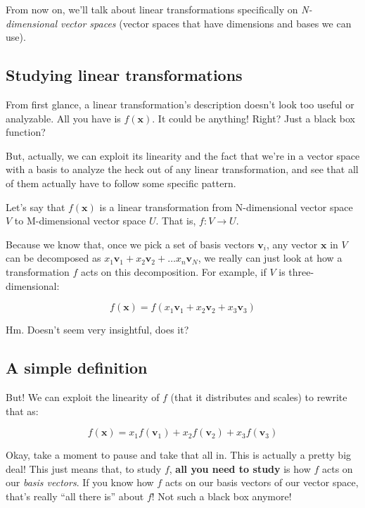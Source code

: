 \documentclass[]{article}
\begin{document}
From now on, we'll talk about linear transformations specifically on
\emph{N-dimensional vector spaces} (vector spaces that have dimensions and bases
we can use).

\hypertarget{studying-linear-transformations}{%
\subsection{Studying linear
transformations}\label{studying-linear-transformations}}

From first glance, a linear transformation's description doesn't look too useful
or analyzable. All you have is \(f(\mathbf{x})\). It could be anything! Right?
Just a black box function?

But, actually, we can exploit its linearity and the fact that we're in a vector
space with a basis to analyze the heck out of any linear transformation, and see
that all of them actually have to follow some specific pattern.

Let's say that \(f(\mathbf{x})\) is a linear transformation from N-dimensional
vector space \(V\) to M-dimensional vector space \(U\). That is,
\(f : V \rightarrow U\).

Because we know that, once we pick a set of basis vectors \(\mathbf{v}_i\), any
vector \(\mathbf{x}\) in \(V\) can be decomposed as
\(x_1 \mathbf{v}_1 + x_2 \mathbf{v}_2 + \ldots x_n \mathbf{v}_N\), we really can
just look at how a transformation \(f\) acts on this decomposition. For example,
if \(V\) is three-dimensional:

\[
f(\mathbf{x}) = f(x_1 \mathbf{v}_1 + x_2 \mathbf{v}_2 + x_3 \mathbf{v}_3)
\]

Hm. Doesn't seem very insightful, does it?

\hypertarget{a-simple-definition}{%
\subsection{A simple definition}\label{a-simple-definition}}

But! We can exploit the linearity of \(f\) (that it distributes and scales) to
rewrite that as:

\[
f(\mathbf{x}) = x_1 f(\mathbf{v}_1) + x_2 f(\mathbf{v}_2) + x_3 f(\mathbf{v}_3)
\]

Okay, take a moment to pause and take that all in. This is actually a pretty big
deal! This just means that, to study \(f\), \textbf{all you need to study} is
how \(f\) acts on our \emph{basis vectors}. If you know how \(f\) acts on our
basis vectors of our vector space, that's really ``all there is'' about \(f\)!
Not such a black box anymore!
\end{document}
